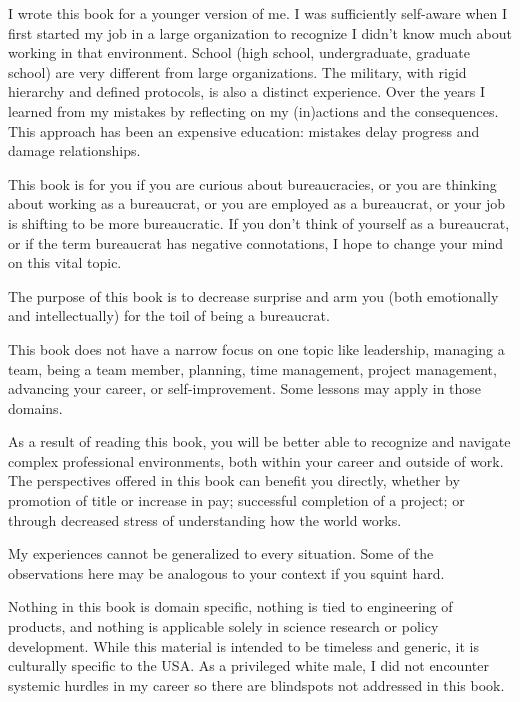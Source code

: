 I wrote this book for a younger version of me. I was sufficiently self-aware when I first started my job in a large organization to recognize I didn't know much about working in that environment. School (high school, undergraduate, graduate school) are very different from large organizations. The military, with rigid hierarchy and defined protocols, is also a distinct experience. Over the years I learned from my mistakes by reflecting on my (in)actions and the consequences. This approach has been an expensive education: mistakes delay progress and damage relationships.

This book is for you if you are curious about bureaucracies, or you are thinking about working as a bureaucrat, or you are employed as a bureaucrat, or your job is shifting to be more bureaucratic. If you don't think of yourself as a bureaucrat, or if the term bureaucrat has negative connotations, I hope to change your mind on this vital topic. 


The purpose of this book is to decrease surprise and arm you (both emotionally and intellectually) for the toil of being a bureaucrat. 

This book does not have a narrow focus on one topic like leadership, managing a team, being a team member, planning, time management, project management, advancing your career, or self-improvement. Some lessons may apply in those domains.

As a result of reading this book, you will be better able to recognize and navigate complex professional environments, both within your career and outside of work. The perspectives offered in this book can benefit you directly, whether by promotion of title or increase in pay; successful completion of a project; or through decreased stress of understanding how the world works.

My experiences cannot be generalized to every situation. Some of the observations here may be analogous to your context if you squint hard. 

Nothing in this book is domain specific, nothing is tied to engineering of products, and nothing is applicable solely in science research or policy development. While this material is intended to be timeless and generic, it is culturally specific to the USA. As a privileged white male, I did not encounter systemic hurdles in my career so there are blindspots not addressed in this book. 


